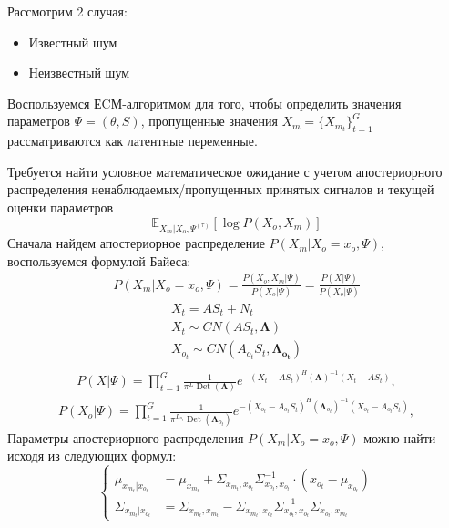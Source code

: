 \documentclass[11pt]{article}
\newcommand{\Expect}{\mathbb{E}}
\DeclareMathOperator{\Det}{Det}
\begin{document}
Рассмотрим 2 случая:
\begin{itemize}
\item
Известный шум
\item
Неизвестный шум
\end{itemize}
\begin{center}
\fontsize{16}{20}\selectfont {}
\end{center}
Воспользуемся ЕCМ-алгоритмом для того, чтобы определить значения параметров $\Psi = (\theta, S)$, пропущенные значения $X_m=\{X_{m_t}\}_{t=1}^G$ рассматриваются как латентные переменные.
\begin{center}
\fontsize{14}{18}\selectfont {}
\end{center}
Требуется найти условное математическое ожидание с учетом апостериорного распределения ненаблюдаемых/пропущенных принятых сигналов и текущей оценки параметров
\begin{equation}
 \Expect_{X_m|X_o, \Psi^{(\tau)}}[\log P(X_o, X_m)]
\end{equation}
Сначала найдем апостериорное распределение $P(X_m|X_o=x_o,\Psi)$, воспользуемся формулой Байеса:
\begin{gather}
P(X_m|X_o=x_o,\Psi) = \frac{P(X_o, X_m|\Psi)}{P(X_o|\Psi)} = \frac{P(X|\Psi)}{P(X_o|\Psi)}
\end{gather}
\begin{gather*}
X_t = AS_t + N_t \\
X_t \sim CN(A S_t,\mathbf{\Lambda})\\
X_{o_t} \sim CN( A_{o_t}S_t, \mathbf{\Lambda_{o_t}})\\
\end{gather*}
\begin{gather}
P(X|\Psi) = \prod_{t=1}^G \frac{1}{\pi^L \Det(\mathbf{\Lambda})}e^{-(X_t-AS_t)^H (\mathbf{\Lambda})^{-1}(X_t-AS_t)},
\end{gather}
\begin{gather}
P(X_o|\Psi) = \prod_{t=1}^G \frac{1}{\pi^{L_{o_t}} \Det(\mathbf{\Lambda}_{o_t})}e^{-(X_{o_t}-A_{o_t}S_t)^H (\mathbf{\Lambda}_{o_t})^{-1}(X_{o_t}-A_{o_t}S_t)},
\end{gather}
Параметры апостериорного распределения $P(X_m|X_o=x_o,\Psi)$ можно найти исходя из следующих формул:
\begin{equation}
\left\{ \begin{aligned}
\mu_{x_{m_t}|x_{o_t}} &= \mu_{x_{m_t}} + \Sigma_{x_{m_t},x_{o_t}}\Sigma_{x_{o_t},x_{o_t}}^{-1}\cdot(x_{o_t}-\mu_{x_{o_t}}) \\
\Sigma_{x_{m_t}|x_{o_t}} &= \Sigma_{x_{m_t},x_{m_t}}-\Sigma_{x_{m_t},x_{o_t}}\Sigma_{x_{o_t},x_{o_t}}^{-1}\Sigma_{x_{o_t},x_{m_t}}
\end{aligned} \right.
\end{equation}
\end{document}
